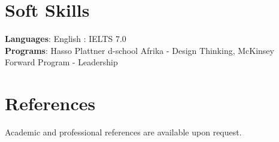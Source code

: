\documentclass[letterpaper,11pt]{article}
\begin{document}
\vspace{0.2cm}


 \section{Soft Skills}
 \begin{itemize}[leftmargin=0.15in, label={}]
    \small{\item{
     \textbf{Languages}{: English : IELTS 7.0} \\
     \textbf{Programs}{: Hasso Plattner d-school Afrika - Design Thinking, McKinsey Forward Program - Leadership} \\
     
    }}
 \end{itemize}

\vspace{0.2cm}

  \section{References}
    {Academic and professional references are available upon request.}

\end{document}

